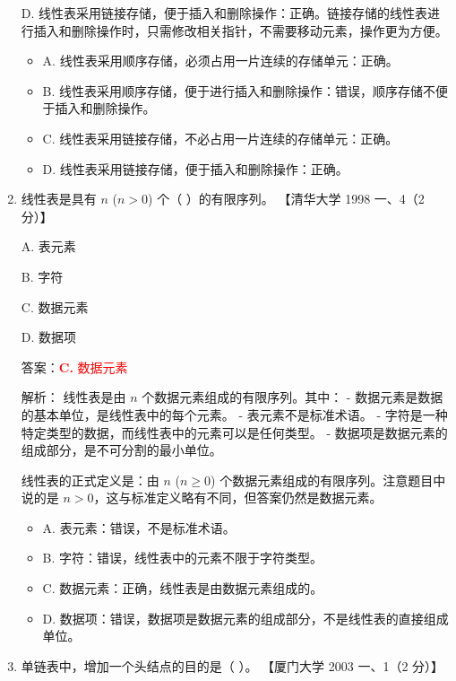 \documentclass[lang=cn,newtx,10pt,scheme=chinese]{../../../elegantbook}
\begin{document}
\begin{enumerate}
        D. 线性表采用链接存储，便于插入和删除操作：正确。链接存储的线性表进行插入和删除操作时，只需修改相关指针，不需要移动元素，操作更为方便。

        \begin{itemize}
            \item A. 线性表采用顺序存储，必须占用一片连续的存储单元：正确。
            \item B. 线性表采用顺序存储，便于进行插入和删除操作：错误，顺序存储不便于插入和删除操作。
            \item C. 线性表采用链接存储，不必占用一片连续的存储单元：正确。
            \item D. 线性表采用链接存储，便于插入和删除操作：正确。
        \end{itemize}
    
        \item 线性表是具有 $n$ ($n > 0$) 个（ ）的有限序列。  
        【清华大学 1998 一、4（2 分）】  
    
        A. 表元素  
    
        B. 字符  
    
        C. 数据元素  
    
        D. 数据项  

        答案：\textcolor{red}{\textbf{C.} 数据元素}

        解析：
        线性表是由 $n$ 个数据元素组成的有限序列。其中：
        - 数据元素是数据的基本单位，是线性表中的每个元素。
        - 表元素不是标准术语。
        - 字符是一种特定类型的数据，而线性表中的元素可以是任何类型。
        - 数据项是数据元素的组成部分，是不可分割的最小单位。

        线性表的正式定义是：由 $n$ ($n \geq 0$) 个数据元素组成的有限序列。注意题目中说的是 $n > 0$，这与标准定义略有不同，但答案仍然是数据元素。

        \begin{itemize}
            \item A. 表元素：错误，不是标准术语。
            \item B. 字符：错误，线性表中的元素不限于字符类型。
            \item C. 数据元素：正确，线性表是由数据元素组成的。
            \item D. 数据项：错误，数据项是数据元素的组成部分，不是线性表的直接组成单位。
        \end{itemize}
    
        \item 单链表中，增加一个头结点的目的是（ ）。  
        【厦门大学 2003 一、1（2 分）】  
    

\end{enumerate}
\end{document}
